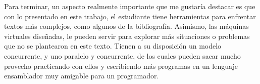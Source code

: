 \documentclass[letterpaper,12pt,oneside]{book}
\begin{document}
			
			Para terminar, un aspecto realmente importante que me gustaría destacar es que con lo presentado en este trabajo, el estudiante
			tiene herramientas para enfrentar textos más complejos, como algunos de la bibliografía. Asimismo,
			las máquinas virtuales diseñadas, le pueden servir
			para explorar más situaciones o problemas que no se plantearon en este texto. Tienen a su disposición un modelo
			concurrente, y uno paralelo y concurrente, de los cuales pueden sacar mucho provecho practicando con ellos y escribiendo
			más programas en un lenguaje ensamblador muy amigable para un programador.
\newpage                                                                                                                                                                                                                                                                                                                                                                                                                                                                                                                                                                                                                                                                                                                                                                                                                                                                                                                                                                                                                                                                                                                                                                                                                                                                                                                                                                                                                                                                                                                                                                                                                                                                                                                                                                              


\printbibliography
\end{document}
